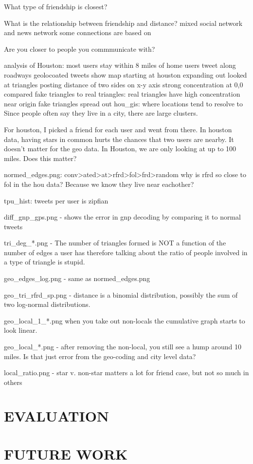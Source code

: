\documentclass{sig-alternate}
\begin{document}
What type of friendship is closest?

What is the relationship between friendship and distance?
mixed social network and news network
some connections are based on 

Are you closer to people you commmunicate with?















analysis of Houston:
most users stay within 8 miles of home
users tweet along roadways
geolocoated tweets show map starting at houston expanding out
looked at triangles posting distance of two sides on x-y axis
strong concentration at 0,0
compared fake triangles to real triangles:
    real triangles have high concentration near origin
    fake triangles spread out
hou_gis: where locations tend to resolve to
Since people often say they live in a city, there are large clusters.

For houston, I picked a friend for each user and went from there.
In houston data, having stars in common hurts the chances that two users are nearby.  It doesn't matter for the geo data. In Houston, we are only looking at up to 100 miles. Does this matter?


normed_edges.png:
conv>ated>at>rfrd>fol>frd>random
why is rfrd so close to fol in the hou data? Because we know they live near eachother?

tpu_hist: tweets per user is zipfian

diff_gnp_gps.png - shows the error in gnp decoding by comparing it to normal tweets

tri_deg_*.png - The number of triangles formed is NOT a function of the number of edges a user has therefore talking about the ratio of people involved in a type of triangle is stupid.

geo_edges_log.png - same as normed_edges.png

geo_tri_rfrd_sp.png - distance is a binomial distribution, possibly the sum of two log-normal distributions.

geo_local_1_*.png when you take out non-locals the cumulative graph starts to look linear.

geo_local_*.png - after removing the non-local, you still see a hump around 10 miles. Is that just error from the geo-coding and city level data?

local_ratio.png - star v. non-star matters a lot for friend case, but not so much in others
\section{EVALUATION}
\section{FUTURE WORK}


 
\end{document}
